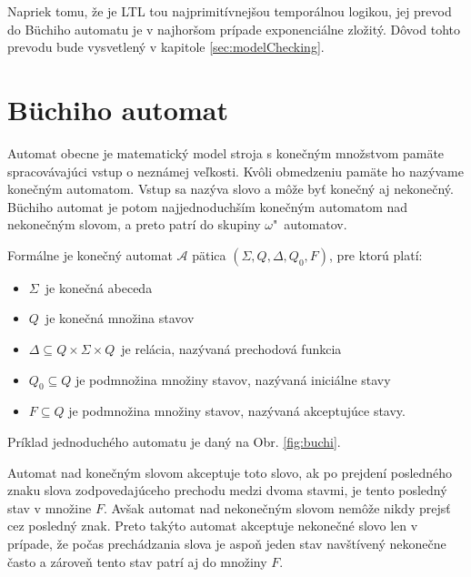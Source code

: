 \documentclass[11pt,final,oneside]{fithesis}
\begin{document}
Napriek tomu, \v ze je LTL tou najprimit\' ivnej\v sou tempor\'alnou logikou, jej prevod do B\"uchiho automatu je v najhor\v som pr\' ipade 
exponenci\' alne zlo\v zit\' y. D\^ ovod tohto prevodu bude vysvetlen\' y v kapitole \ref{sec:modelChecking}. 
\cite{Clarke:MC:LTL}

\section{B\"uchiho automat}	%
\label{sec:buchi}
Automat obecne je matematick\' y model stroja s kone\v cn\' ym mno\v zstvom pam\" ate spracov\' avaj\' uci vstup o nezn\' amej ve\v lkosti. 
Kv\^ oli obmedzeniu pam\" ate ho naz\' yvame kone\v cn\' ym automatom. Vstup sa naz\' yva slovo a m\^ o\v ze by\v t kone\v cn\' y aj nekone\v cn\' y.
B\" uchiho automat je potom najjednoduch\v s\' im kone\v cn\'ym automatom nad nekone\v cn\'ym slovom, a preto patr\'i do skupiny {$\omega$"~au\-to\-matov}.

Form\'alne je kone\v cn\' y automat $\mathcal{A}$ p\" atica $(\Sigma, Q, \Delta, Q_0, F)$, pre ktor\' u plat\'i:
\begin{itemize}
\item $\Sigma$\ je kone\v cn\'a abeceda
\item $Q$\ je kone\v cn\'a mno\v zina stavov
\item $\Delta \subseteq Q \times \Sigma \times Q$\ je rel\' acia, naz\'yvan\'a prechodov\'a funkcia
\item $Q_0 \subseteq Q$ je podmno\v zina mno\v ziny stavov, naz\' yvan\' a inici\' alne stavy
\item $F \subseteq Q$ je podmno\v zina mno\v ziny stavov, naz\'yvan\'a akceptuj\'uce stavy.
\end{itemize}
Pr\'iklad jednoduch\'eho automatu je dan\'y na Obr. \ref{fig:buchi}.

Automat nad kone\v cn\'ym slovom akceptuje toto slovo, ak po prejden\' i posledn\'eho znaku slova zodpovedaj\' uceho prechodu medzi dvoma stavmi, 
je tento posledn\' y stav v mno\v zine $F$. Av\v sak automat nad nekone\v cn\' ym slovom nem\^ o\v ze nikdy prejs\v t cez posledn\' y znak. Preto tak\' yto 
automat akceptuje nekone\v cn\' e slovo len v pr\' ipade, \v ze po\v cas prech\' adzania slova je aspo\v n jeden stav nav\v st\'iven\'y nekone\v cne \v casto 
a z\'arove\v n tento stav patr\'i aj do mno\v ziny $F$.
\end{document}

